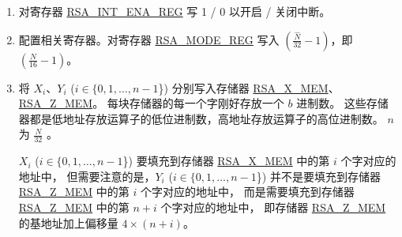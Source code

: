 \documentclass[main\_\_CN.tex]{subfiles}
\begin{document}
\begin{enumerate}

    \item 对寄存器 \hyperref[regdesc:RSAINTENAREG]{RSA\_INT\_ENA\_REG} 写 1 / 0 以开启 / 关闭中断。
    
    \item 配置相关寄存器。对寄存器 \hyperref[regdesc:RSAMODEREG]{RSA\_MODE\_REG} 写入 \begin{math}( \frac{\hat{N}}{32} - 1 )\end{math}，即 \begin{math}(  \frac{N}{16} - 1 )\end{math}。

    \item 将 \begin{math}{X}_{i}\end{math}、\begin{math}{Y}_{i}\end{math} (\begin{math}i \in \{ 0, 1, \dots, n-1 \end{math}\}) 分别写入存储器 \hyperref[regdesc:RSAmemory]{RSA\_X\_MEM}、\hyperref[regdesc:RSAmemory]{RSA\_Z\_MEM}。
        每块存储器的每一个字刚好存放一个 \begin{math}b\end{math} 进制数。
        这些存储器都是低地址存放运算子的低位进制数，高地址存放运算子的高位进制数。
        \begin{math}n\end{math} 为 \begin{math} \frac{N}{32} \end{math} 。
        
         \begin{math}{X}_{i}\end{math} (\begin{math}i \in \{ 0, 1, \dots, n-1 \end{math}\}) 要填充到存储器 \hyperref[regdesc:RSAmemory]{RSA\_X\_MEM} 中的第 \begin{math}i\end{math} 个字对应的地址中，
        但需要注意的是，\begin{math}{Y}_{i}\end{math} (\begin{math}i\in\{ 0, 1, \dots, n-1 \end{math}\}) 并不是要填充到存储器 \hyperref[regdesc:RSAmemory]{RSA\_Z\_MEM} 中的第 \begin{math}i\end{math} 个字对应的地址中，
        而是需要填充到存储器 \hyperref[regdesc:RSAmemory]{RSA\_Z\_MEM} 中的第 \begin{math}n+i\end{math} 个字对应的地址中，
        即存储器 \hyperref[regdesc:RSAmemory]{RSA\_Z\_MEM} 的基地址加上偏移量 \begin{math}4 \times (n+i) \end{math}。
        

\end{enumerate}
\end{document}
